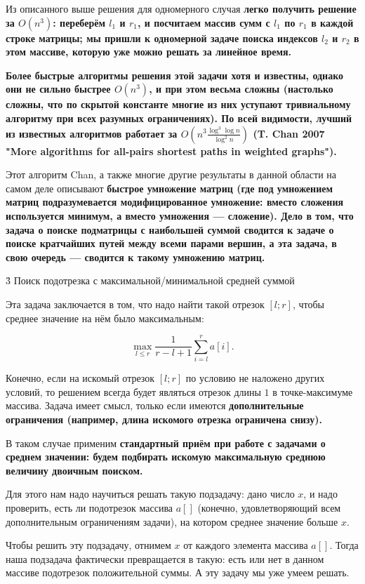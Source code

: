 Из описанного выше решения для одномерного случая \bf{легко получить} решение за $O(n^3)$: переберём $l_1$ и $r_1$, и посчитаем массив сумм с $l_1$ по $r_1$ в каждой строке матрицы; мы пришли к одномерной задаче поиска индексов $l_2$ и $r_2$ в этом массиве, которую уже можно решать за линейное время.

\bf{Более быстрые} алгоритмы решения этой задачи хотя и известны, однако они не сильно быстрее $O(n^3)$, и при этом весьма сложны (настолько сложны, что по скрытой константе многие из них уступают тривиальному алгоритму при всех разумных ограничениях). По всей видимости, лучший из известных алгоритмов работает за $O \left( n^3 \frac{ \log^3 \log n }{ \log^2 n} \right)$ (T. Chan 2007 "More algorithms for all-pairs shortest paths in weighted graphs").

Этот алгоритм Chan, а также многие другие результаты в данной области на самом деле описывают \bf{быстрое умножение} матриц (где под умножением матриц подразумевается модифицированное умножение: вместо сложения используется минимум, а вместо умножения --- сложение). Дело в том, что задача о поиске подматрицы с наибольшей суммой сводится к задаче о поиске кратчайших путей между всеми парами вершин, а эта задача, в свою очередь --- сводится к такому умножению матриц.

\h3{ Поиск подотрезка с максимальной/минимальной средней суммой }

Эта задача заключается в том, что надо найти такой отрезок $[l;r]$, чтобы среднее значение на нём было максимальным:

$$ \max_{l \le r} \frac{ 1 }{ r-l+1 } \sum_{i=l}^{r} a[i]. $$

Конечно, если на искомый отрезок $[l;r]$ по условию не наложено других условий, то решением всегда будет являться отрезок длины $1$ в точке-максимуме массива. Задача имеет смысл, только если имеются \bf{дополнительные ограничения} (например, длина искомого отрезка ограничена снизу).

В таком случае применим \bf{стандартный приём} при работе с задачами о среднем значении: будем подбирать искомую максимальную среднюю величину \bf{двоичным поиском}.

Для этого нам надо научиться решать такую подзадачу: дано число $x$, и надо проверить, есть ли подотрезок массива $a[]$ (конечно, удовлетворяющий всем дополнительным ограничениям задачи), на котором среднее значение больше $x$.

Чтобы решить эту подзадачу, отнимем $x$ от каждого элемента массива $a[]$. Тогда наша подзадача фактически превращается в такую: есть или нет в данном массиве подотрезок положительной суммы. А эту задачу мы уже умеем решать.

